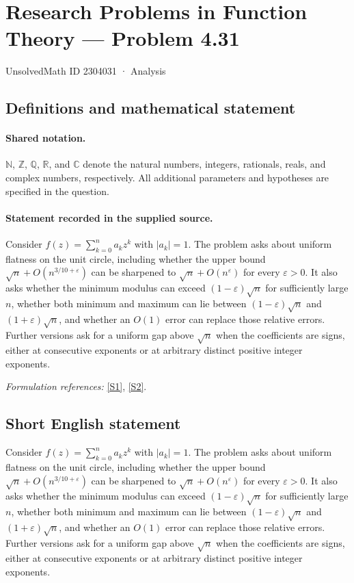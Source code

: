 \documentclass[11pt]{article}
\newcommand{\sref}[2]{\hyperlink{source:#1:#2}{[S#2]}}
\begin{document}
\setcounter{section}{2304030}
\section{Research Problems in Function Theory — Problem 4.31}\label{2304031}
{\small UnsolvedMath ID 2304031 · Analysis}
\subsection{Definitions and mathematical statement}

\paragraph{Shared notation.}$\mathbb N$, $\mathbb Z$, $\mathbb Q$, $\mathbb R$, and $\mathbb C$ denote the natural numbers, integers, rationals, reals, and complex numbers, respectively. All additional parameters and hypotheses are specified in the question.


\paragraph{Statement recorded in the supplied source.}
Consider $f(z)=\sum_{k=0}^na_kz^k$ with $|a_k|=1$. The problem asks about uniform flatness on the unit circle, including whether the upper bound $\sqrt n+O(n^{3/10+\varepsilon})$ can be sharpened to $\sqrt n+O(n^\varepsilon)$ for every $\varepsilon>0$. It also asks whether the minimum modulus can exceed $(1-\varepsilon)\sqrt n$ for sufficiently large $n$, whether both minimum and maximum can lie between $(1-\varepsilon)\sqrt n$ and $(1+\varepsilon)\sqrt n$, and whether an $O(1)$ error can replace those relative errors. Further versions ask for a uniform gap above $\sqrt n$ when the coefficients are signs, either at consecutive exponents or at arbitrary distinct positive integer exponents.
\par\smallskip\textit{Formulation references:} \sref{2304031}{1}, \sref{2304031}{2}.
\subsection{Short English statement}
Consider $f(z)=\sum_{k=0}^na_kz^k$ with $|a_k|=1$. The problem asks about uniform flatness on the unit circle, including whether the upper bound $\sqrt n+O(n^{3/10+\varepsilon})$ can be sharpened to $\sqrt n+O(n^\varepsilon)$ for every $\varepsilon>0$. It also asks whether the minimum modulus can exceed $(1-\varepsilon)\sqrt n$ for sufficiently large $n$, whether both minimum and maximum can lie between $(1-\varepsilon)\sqrt n$ and $(1+\varepsilon)\sqrt n$, and whether an $O(1)$ error can replace those relative errors. Further versions ask for a uniform gap above $\sqrt n$ when the coefficients are signs, either at consecutive exponents or at arbitrary distinct positive integer exponents.
\end{document}
